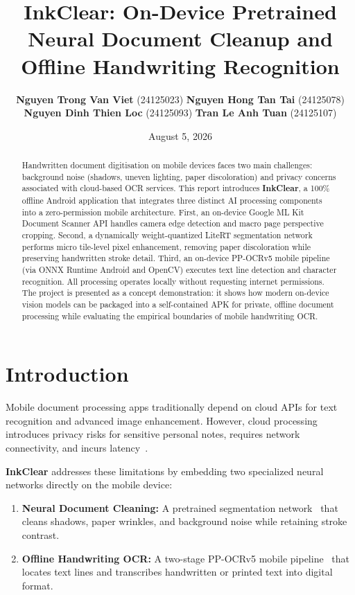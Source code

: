 \documentclass[11pt,a4paper]{article}
\title{\textbf{InkClear: On-Device Pretrained Neural Document Cleanup and Offline Handwriting Recognition}}
\author{\textbf{Nguyen Trong Van Viet} (24125023) \quad \textbf{Nguyen Hong Tan Tai} (24125078) \\
\textbf{Nguyen Dinh Thien Loc} (24125093) \quad \textbf{Tran Le Anh Tuan} (24125107)}
\date{August 5, 2026}
\begin{document}
\maketitle

\begin{abstract}
Handwritten document digitisation on mobile devices faces two main challenges: background noise (shadows, uneven lighting, paper discoloration) and privacy concerns associated with cloud-based OCR services. This report introduces \textbf{InkClear}, a 100\% offline Android application that integrates three distinct AI processing components into a zero-permission mobile architecture. First, an on-device Google ML Kit Document Scanner API handles camera edge detection and macro page perspective cropping. Second, a dynamically weight-quantized LiteRT segmentation network performs micro tile-level pixel enhancement, removing paper discoloration while preserving handwritten stroke detail. Third, an on-device PP-OCRv5 mobile pipeline (via ONNX Runtime Android and OpenCV) executes text line detection and character recognition. All processing operates locally without requesting internet permissions. The project is presented as a concept demonstration: it shows how modern on-device vision models can be packaged into a self-contained APK for private, offline document processing while evaluating the empirical boundaries of mobile handwriting OCR.
\end{abstract}

\tableofcontents
\newpage

\section{Introduction}

Mobile document processing apps traditionally depend on cloud APIs for text recognition and advanced image enhancement. However, cloud processing introduces privacy risks for sensitive personal notes, requires network connectivity, and incurs latency~\cite{shi2016edge}.

\textbf{InkClear} addresses these limitations by embedding two specialized neural networks directly on the mobile device:
\begin{enumerate}[leftmargin=*]
  \item \textbf{Neural Document Cleaning:} A pretrained segmentation network~\cite{sliedes2021binarize} that cleans shadows, paper wrinkles, and background noise while retaining stroke contrast.
  \item \textbf{Offline Handwriting OCR:} A two-stage PP-OCRv5 mobile pipeline~\cite{du2020ppocr} that locates text lines and transcribes handwritten or printed text into digital format.
\end{enumerate}
\end{document}

